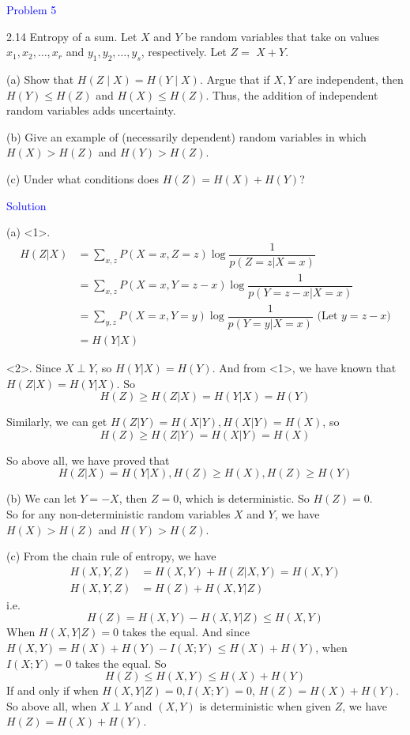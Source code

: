 \textcolor{blue}{Problem 5}

2.14 Entropy of a sum. Let $X$ and $Y$ be random variables that take on values $x_1, x_2, \ldots, x_r$ and $y_1, y_2, \ldots, y_s$, respectively. Let $Z=$ $X+Y$.

(a) Show that $H(Z \mid X)=H(Y \mid X)$. Argue that if $X, Y$ are independent, then $H(Y) \leq H(Z)$ and $H(X) \leq H(Z)$. Thus, the addition of independent random variables adds uncertainty.

(b) Give an example of (necessarily dependent) random variables in which $H(X)>H(Z)$ and $H(Y)>H(Z)$.

(c) Under what conditions does $H(Z)=H(X)+H(Y)$?

\textcolor{blue}{Solution}

(a) <1>.
\begin{align*}
H(Z|X) &= \sum_{x,z}P(X=x,Z=z)\log \dfrac{1}{p(Z=z|X=x)} \\
&= \sum_{x,z}P(X=x,Y=z-x)\log \dfrac{1}{p(Y=z-x|X=x)} \\
&= \sum_{y,z}P(X=x,Y=y)\log \dfrac{1}{p(Y=y|X=x)} \text{\ \ \ (Let $y=z-x$)} \\
&= H(Y|X)
\end{align*}

<2>. Since $X\perp Y$, so $H(Y|X)=H(Y)$. And from <1>, we have known that $H(Z|X)=H(Y|X)$. So
$$H(Z) \geq H(Z|X) = H(Y|X) = H(Y)$$

Similarly, we can get $H(Z|Y)=H(X|Y), H(X|Y)=H(X)$, so
$$ H(Z) \geq H(Z|Y) = H(X|Y) = H(X)$$

So above all, we have proved that
$$H(Z|X)=H(Y|X), H(Z) \geq H(X), H(Z) \geq H(Y)$$

(b) We can let $Y=-X$, then $Z=0$, which is deterministic. So $H(Z)=0$. \\
So for any non-deterministic random variables $X$ and $Y$, we have $H(X)>H(Z)$ and $H(Y)>H(Z)$.

(c) From the chain rule of entropy, we have
\begin{align*}
H(X,Y,Z) &= H(X,Y) + H(Z|X,Y) = H(X,Y) \\
H(X,Y,Z) &= H(Z) + H(X,Y|Z)
\end{align*}
i.e.
$$H(Z)=H(X,Y)-H(X,Y|Z)\leq H(X,Y)$$
When $H(X,Y|Z)=0$ takes the equal. And since $H(X,Y)=H(X)+H(Y)-I(X;Y)\leq H(X)+H(Y)$, when $I(X;Y)=0$ takes the equal. So
$$H(Z)\leq H(X,Y) \leq H(X)+H(Y)$$
If and only if when $H(X,Y|Z)=0,I(X;Y)=0$, $H(Z)=H(X)+H(Y)$.\\
So above all, when $X\perp Y$ and $(X,Y)$ is deterministic when given $Z$, we have $H(Z)=H(X)+H(Y)$.